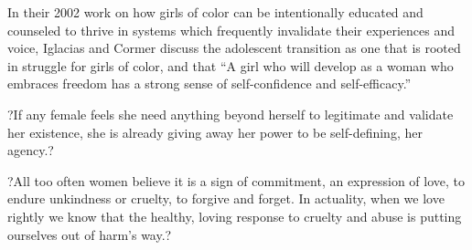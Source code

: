 \documentclass[a4paper, 11pt]{article} %
\begin{document}
In their 2002 work on how girls of color can be intentionally educated and counseled to thrive in systems which frequently invalidate their experiences and voice, Iglacias and Cormer discuss the adolescent transition as one that is rooted in struggle for girls of color, and that ``A girl who will develop as a woman who embraces freedom has a strong sense of self-confidence and self-efficacy.'' \cite{iglesiascormier}

?If any female feels she need anything beyond herself to legitimate and validate her existence, she is already giving away her power to be self-defining, her agency.? \cite{hooksforeveryone}

?All too often women believe it is a sign of commitment, an expression of love, to endure unkindness or cruelty, to forgive and forget. In actuality, when we love rightly we know that the healthy, loving response to cruelty and abuse is putting ourselves out of harm's way.? \cite{newvisions}



{}


\end{document}
